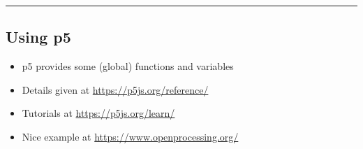 \documentclass{article}[18pt]
\providecommand{\tightlist}{%
	\setlength{\itemsep}{0pt}\setlength{\parskip}{0pt}}
\begin{document}
\begin{center}\rule{0.5\linewidth}{\linethickness}\end{center}

\hypertarget{using-p5}{%
	\subsection{Using p5}\label{using-p5}}

\begin{itemize}
	\tightlist
	\item
	p5 provides some (global) functions and variables
	\item
	Details given at \url{https://p5js.org/reference/}
	\item
	Tutorials at \url{https://p5js.org/learn/}
	\item
	Nice example at \url{https://www.openprocessing.org/}
\end{itemize}
\end{document}

